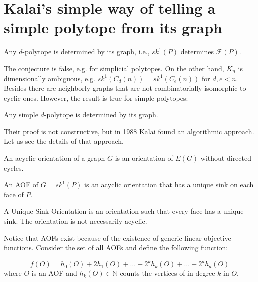 \chapter{Kalai's simple way of telling a simple polytope from its graph}


\begin{conj}
Any $d$-polytope is determined by its graph, i.e., $sk^1(P)$ determines $\mathcal{F}(P)$.
\end{conj}

The conjecture is false, e.g. for simplicial polytopes. On the other hand, $K_n$ is dimensionally ambiguous, e.g. $sk^1(C_d(n)) = sk^1(C_e(n))$ for $d , e < n$. Besides there are neighborly graphs that are not combinatorially isomorphic to cyclic ones. However, the result is true for simple polytopes:

\begin{theorem}
Any simple $d$-polytope is  determined by its graph.
\end{theorem}

Their proof is not constructive, but in 1988 Kalai found an algorithmic approach. Let us see the details of that approach.

\begin{definition}
An acyclic orientation of a graph $G$ is an orientation of $E(G)$ without directed cycles.
\end{definition}

\begin{definition}
An AOF of $G = sk^1(P)$ is an acyclic orientation that has a unique sink on each face of $P$.
\end{definition}

\begin{definition}
A Unique Sink Orientation is an orientation such that every face has a unique sink. The orientation is not necessarily acyclic.
\end{definition}

Notice that AOFs exist because of the existence of generic linear objective functions. Consider the set of all AOFs and define the following function:

\begin{equation}
f(O) = h_0(O) + 2h_1(O) + \ldots + 2^kh_k(O) + \ldots + 2^dh_d(O)
\end{equation}
where $O$ is an AOF and $h_k(O)\in\mathbb{N}$ counts the vertices of in-degree $k$ in $O$.

